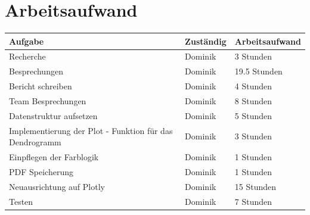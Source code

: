 \documentclass[11pt,a4paper]{article}
\begin{document}
	\section{Arbeitsaufwand}
	\begin{table}[h]
		\begin{tabular}{l|l|l}
			Aufgabe                       & Zuständig & Arbeitsaufwand \\ 
			\hline
			Recherche                     & Dominik    & 3 Stunden       \\
			Besprechungen                 & Dominik    & 19.5 Stunden    \\
			Bericht schreiben             & Dominik    & 4 Stunden  		\\
			Team Besprechungen            & Dominik    & 8 Stunden 		\\
			Datenstruktur aufsetzen           & Dominik    & 5 Stunden       \\
			Implementierung der Plot - Funktion für das Dendrogramm     	  & Dominik    & 3 Stunden       \\ 
			Einpflegen der Farblogik       & Dominik    & 1 Stunden       \\
			PDF Speicherung               & Dominik    & 1 Stunden       \\
			Neuausrichtung auf Plotly          & Dominik    & 15 Stunden       \\ 
			Testen                        & Dominik    & 7 Stunden      \\ 
			
		\end{tabular}
	\end{table}
	
	
	
	
\end{document}
